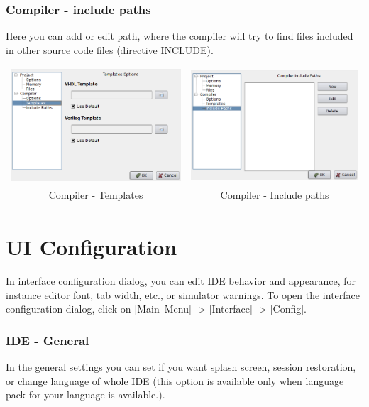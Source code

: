        \subsubsection{Compiler - include paths}
            Here you can add or edit path, where the compiler will try to find files included in other source code files
            (directive INCLUDE).

            \begin{table}[h!]
                \begin{tabular}{cc}
                    \includegraphics[width=.5\textwidth]{img/config5.png}
                        &
                    \includegraphics[width=.5\textwidth]{img/config6.png}
                        \\
                    Compiler - Templates & Compiler - Include paths
                \end{tabular}
                \end{table}

\clearpage
\section{UI Configuration}
    In interface configuration dialog, you can edit IDE behavior and appearance, for instance editor font, tab width,
    etc., or simulator warnings. To open the interface configuration dialog, click on [Main~Menu] -> [Interface] ->
    [Config].

    \subsubsection{IDE - General}
        In the general settings you can set if you want splash screen, session restoration, or change language of whole
        IDE (this option is available only when language pack for your language is available.).

